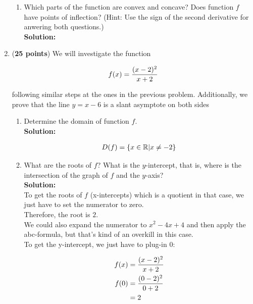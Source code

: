 \documentclass[a4paper]{article}
\begin{document}
\begin{enumerate}
\begin{enumerate}
	
	\item Which parts of the function are convex and concave? Does function $f$ have points of inflection? (Hint: Use the sign of the second derivative for anwering both questions.)\\
	\textbf{Solution:}\\	
	
		
\end{enumerate}




\item (\textbf{25 points}) We will investigate the function

\begin{align}
	f(x) = \frac{(x-2)^2}{x+2}\notag
\end{align}

following similar steps at the ones in the previous problem. Additionally, we prove that the line $y = x - 6$ is a slant asymptote on both sides

\begin{enumerate}
	\item Determine the domain of function $f$.\\
	\textbf{Solution:}
		
\begin{align}
	D(f) = \{ x \in \mathbb{R} | x \neq -2 \}\notag
\end{align}
\vspace{1em}		
		
		
	\item What are the roots of $f$? What is the $y$-intercept, that is, where is the intersection of the graph of $f$ and the $y$-axis?\\
	\textbf{Solution:}\\
	
To get the roots of $f$ (x-intercepts) which is a quotient in that case, we just have to set the numerator to zero.\\

Therefore, the root is $2$.\\
We could also expand the numerator to $x^2 - 4x + 4$ and then apply the abc-formula, but that's kind of an overkill in this case.\\

To get the y-intercept, we just have to plug-in 0:

\begin{align}
	f(x) &= \frac{(x-2)^2}{x+2}\notag\\
	f(0) &= \frac{(0-2)^2}{0+2}\notag\\
	&= 2\notag
\end{align}	
	

\end{enumerate}
\end{enumerate}
\end{document}
